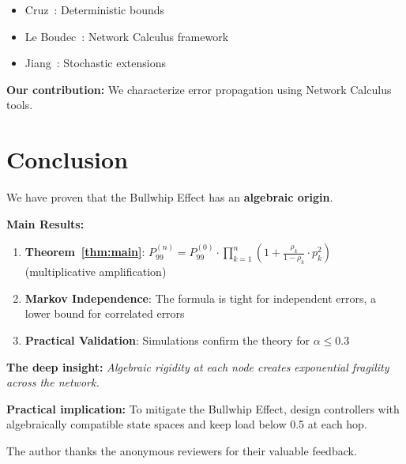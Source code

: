 \documentclass[11pt]{article}
\begin{document}
\begin{itemize}
    \item Cruz~\cite{cruz1991calculus}: Deterministic bounds
    \item Le Boudec~\cite{le2001network}: Network Calculus framework
    \item Jiang~\cite{jiang2003stochastic}: Stochastic extensions
\end{itemize}

\textbf{Our contribution:} We characterize error propagation using Network Calculus tools.

\section{Conclusion}

We have proven that the Bullwhip Effect has an \textbf{algebraic origin}.

\textbf{Main Results:}
\begin{enumerate}
    \item \textbf{Theorem~\ref{thm:main}}: $P_{99}^{(n)} = P_{99}^{(0)} \cdot \prod_{k=1}^{n} (1 + \frac{\rho_k}{1-\rho_k} \cdot p_k^2)$ (multiplicative amplification)
    \item \textbf{Markov Independence}: The formula is tight for independent errors, a lower bound for correlated errors
    \item \textbf{Practical Validation}: Simulations confirm the theory for $\alpha \leq 0.3$
\end{enumerate}

\textbf{The deep insight:} \textit{Algebraic rigidity at each node creates exponential fragility across the network.}

\textbf{Practical implication:} To mitigate the Bullwhip Effect, design controllers with algebraically compatible state spaces and keep load below 0.5 at each hop.

\begin{acks}
The author thanks the anonymous reviewers for their valuable feedback.
\end{acks}



\end{document}
